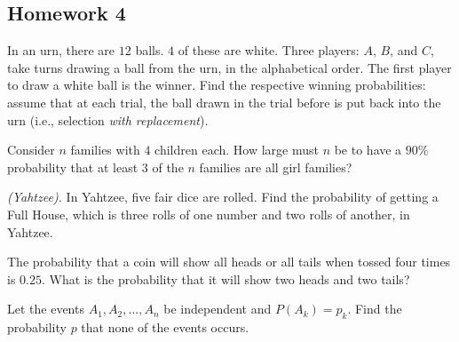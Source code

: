 \subsection{Homework 4}
\begin{problem}[Handout 5, \# 2]
  In an urn, there are \(12\) balls. \(4\) of these are white. Three
  players: \(A\), \(B\), and \(C\), take turns drawing a ball from the urn,
  in the alphabetical order. The first player to draw a white ball is the
  winner. Find the respective winning probabilities: assume that at each
  trial, the ball drawn in the trial before is put back into the urn (i.e.,
  selection \emph{with replacement}).
\end{problem}
\begin{solution*}
\end{solution*}

\begin{problem}[Handout 5, \# 8]
  Consider \(n\) families with \(4\) children each. How large must \(n\) be
  to have a \(90\%\) probability that at least \(3\) of the \(n\) families
  are all girl families?
\end{problem}
\begin{solution*}
\end{solution*}

\begin{problem}[Handout 5, \# 10]
  \emph{(Yahtzee).} In Yahtzee, five fair dice are rolled. Find the
  probability of getting a Full House, which is three rolls of one number
  and two rolls of another, in Yahtzee.
\end{problem}
\begin{solution*}
\end{solution*}

\begin{problem}[Handout 5, \# 12]
  The probability that a coin will show all heads or all tails when tossed
  four times is \(0.25\). What is the probability that it will show two
  heads and two tails?
\end{problem}
\begin{solution*}
\end{solution*}

\begin{problem}[Handout 5, \# 13]
  Let the events \(A_1, A_2,\dotsc,A_n\) be independent and
  \(P(A_k)=p_k\). Find the probability \(p\) that none of the events
  occurs.
\end{problem}
\begin{solution*}
\end{solution*}

